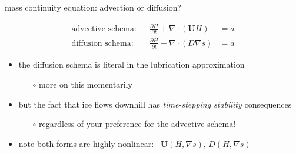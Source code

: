 \documentclass[svgnames,
               hyperref={colorlinks,citecolor=DeepPink4,linkcolor=FireBrick,urlcolor=Maroon},
               usepdftitle=false]  %
               {beamer}
\newcommand{\grad}{\nabla}
\newcommand{\bU}{\mathbf{U}}
\begin{document}
\begin{frame}{mass continuity equation: advection or diffusion?}

\begin{align*}
\text{advective schema:} && \frac{\partial H}{\partial t} + \nabla \cdot \left(\bU H\right) &= a \\
\text{diffusion schema:} && \frac{\partial H}{\partial t} - \nabla \cdot \left(D \grad s\right) &= a
\end{align*}
\begin{itemize}
\item the diffusion schema is literal in the lubrication approximation
    \begin{itemize}
    \item[$\circ$] more on this momentarily
    \end{itemize}
\item but the fact that ice flows downhill has \emph{time-stepping stability} consequences
    \begin{itemize}
    \item[$\circ$] regardless of your preference for the advective schema!
    \end{itemize}
\item note both forms are highly-nonlinear: \, $\bU(H,\grad s), \, D(H,\grad s)$
\end{itemize}
\end{frame}
\end{document}
